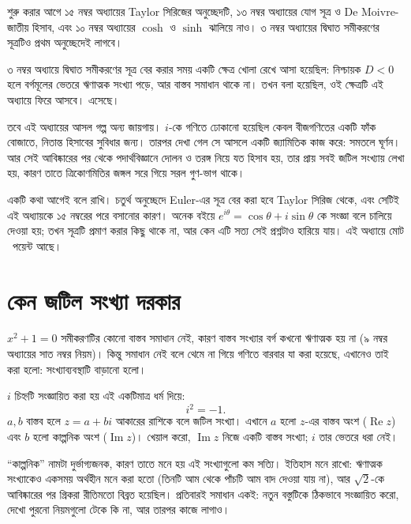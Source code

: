 \documentclass[11pt]{article}
\begin{document}

\noindent
শুরু করার আগে ১৫ নম্বর অধ্যায়ের Taylor সিরিজের অনুচ্ছেদটি, ১৩ নম্বর
অধ্যায়ের যোগ সূত্র ও De Moivre-জাতীয় হিসাব, এবং ১০ নম্বর অধ্যায়ের
$\cosh$ ও $\sinh$ ঝালিয়ে নাও। ৩ নম্বর অধ্যায়ের দ্বিঘাত সমীকরণের সূত্রটিও
প্রথম অনুচ্ছেদেই লাগবে।

৩ নম্বর অধ্যায়ে দ্বিঘাত সমীকরণের সূত্র বের করার সময় একটি ক্ষেত্র খোলা রেখে
আসা হয়েছিল: নিশ্চায়ক $D < 0$ হলে বর্গমূলের ভেতরে ঋণাত্মক সংখ্যা পড়ে, আর
বাস্তব সমাধান থাকে না। তখন বলা হয়েছিল, ওই ক্ষেত্রটি এই অধ্যায়ে ফিরে আসবে।
এসেছে।

তবে এই অধ্যায়ের আসল গল্প অন্য জায়গায়। $i$-কে গণিতে ঢোকানো হয়েছিল কেবল
বীজগণিতের একটি ফাঁক বোজাতে, নিতান্ত হিসাবের সুবিধার জন্য। তারপর দেখা গেল সে
আসলে একটি জ্যামিতিক কাজ করে: সমতলে ঘূর্ণন। আর সেই আবিষ্কারের পর থেকে
পদার্থবিজ্ঞানে দোলন ও তরঙ্গ নিয়ে যত হিসাব হয়, তার প্রায় সবই জটিল সংখ্যায়
লেখা হয়, কারণ তাতে ত্রিকোণমিতির জঙ্গল সরে গিয়ে সরল গুণ-ভাগ থাকে।

একটি কথা আগেই বলে রাখি। চতুর্থ অনুচ্ছেদে Euler-এর সূত্র বের করা হবে Taylor
সিরিজ থেকে, এবং সেটিই এই অধ্যায়কে ১৫ নম্বরের পরে বসানোর কারণ। অনেক বইয়ে
$e^{i\theta} = \cos\theta + i\sin\theta$ কে সংজ্ঞা বলে চালিয়ে দেওয়া হয়; তখন
সূত্রটি প্রমাণ করার কিছু থাকে না, আর কেন এটি সত্য সেই প্রশ্নটাও হারিয়ে যায়।
এই অধ্যায়ে মোট \totalpoints\ পয়েন্ট আছে।

\section{কেন জটিল সংখ্যা দরকার}

$x^{2} + 1 = 0$ সমীকরণটির কোনো বাস্তব সমাধান নেই, কারণ বাস্তব সংখ্যার বর্গ
কখনো ঋণাত্মক হয় না (৯ নম্বর অধ্যায়ের সাত নম্বর নিয়ম)। কিন্তু সমাধান নেই
বলে থেমে না গিয়ে গণিতে বারবার যা করা হয়েছে, এখানেও তাই করা হলো: সংখ্যাব্যবস্থাটি
বাড়ানো হলো।

\begin{idea}[জটিল সংখ্যা]
$i$ চিহ্নটি সংজ্ঞায়িত করা হয় এই একটিমাত্র ধর্ম দিয়ে:
\[
  i^{2} = -1 .
\]
$a, b$ বাস্তব হলে $z = a + bi$ আকারের রাশিকে বলে জটিল সংখ্যা। এখানে $a$ হলো
$z$-এর বাস্তব অংশ ($\operatorname{Re}z$) এবং $b$ হলো কাল্পনিক অংশ
($\operatorname{Im}z$)। খেয়াল করো, $\operatorname{Im}z$ নিজে একটি বাস্তব
সংখ্যা; $i$ তার ভেতরে ধরা নেই।
\end{idea}

\begin{remark}
``কাল্পনিক'' নামটা দুর্ভাগ্যজনক, কারণ তাতে মনে হয় এই সংখ্যাগুলো কম সত্যি।
ইতিহাস মনে রাখো: ঋণাত্মক সংখ্যাকেও একসময় অর্থহীন মনে করা হতো (তিনটি আম থেকে
পাঁচটি আম বাদ দেওয়া যায় না), আর $\sqrt{2}$-কে আবিষ্কারের পর গ্রিকরা রীতিমতো
বিব্রত হয়েছিল। প্রতিবারই সমাধান একই: নতুন বস্তুটিকে ঠিকভাবে সংজ্ঞায়িত করো,
দেখো পুরনো নিয়মগুলো টেকে কি না, আর তারপর কাজে লাগাও।

\end{remark}
\end{document}

